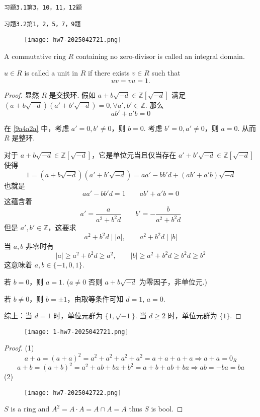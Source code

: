 \begin{lstlisting}
习题3.1第3，10，11，12题

习题3.2第1，2，5，7，9题
\end{lstlisting}
\begin{exercise}
\begin{figure}[H]
\centering
\texttt{[image: hw7-2025042721.png]}
\label{}
\end{figure}
\end{exercise}
\begin{definition}
A commutative ring $R$ containing no zero-divisor is called an integral domain.
\end{definition}
\begin{definition}[unit]
$u \in R$ is called a unit in $R$ if there exists $v \in R$ such that
\[
u v=v u=1 .
\]
\end{definition}
\begin{proof}
显然 $R$ 是交换环. 假如 $a+b \sqrt{ -d }\in \mathbb{Z}[\sqrt{ -d }]$ 满足 $(a+b \sqrt{ -d })(a'+b'\sqrt{ -d })=0, \forall a', b'\in \mathbb{Z}$. 那么
\begin{equation}
ab'+a'b=0
\label{9a4a2a}
\end{equation}

在 \cref{9a4a2a} 中，考虑 $a'=0,b'\neq0$，则 $b=0$. 考虑 $b'=0,a'\neq0$，则 $a=0$. 从而 $R$ 是整环.

对于 $a+b \sqrt{ -d }\in \mathbb{Z}[\sqrt{ -d }]$，它是单位元当且仅当存在 $a'+b'\sqrt{ -d }\in \mathbb{Z}[\sqrt{ -d }]$ 使得
\[
1=(a+b \sqrt{ -d })(a'+b'\sqrt{ -d })=aa'-b b'd+(ab'+a'b)\sqrt{ -d }
\]
也就是
\[
aa'-b b'd=1\qquad ab'+a'b=0
\]
这蕴含着
\[
a'=\frac{a}{a^2+b^2d}\qquad b'=-\frac{b}{a^2+b^2d}
\]
但是 $a', b'\in \mathbb{Z}$，这要求
\[
a^2+b^2d\mid \lvert a \rvert ,\qquad a^2+b^2d\mid \lvert b \rvert 
\]
当 $a,b$ 非零时有
\[
\lvert a \rvert \geq a^2+b^2d\geq a^2,\qquad \lvert b \rvert \geq a^2+b^2d\geq b^2d\geq b^2
\]
这意味着 $a, b\in \{ -1,0,1 \}$.

若 $b=0$，则 $a=1$. ($a\neq0$ 否则 $a+b \sqrt{ -d }$ 为零因子，非单位元.)

若 $b\neq0$，则 $b=\pm1$，由取等条件可知 $d=1$, $a=0$.

综上：当 $d=1$ 时，单位元群为 $\{ 1,\sqrt{ -1 } \}$. 当 $d\geq2$ 时，单位元群为 $\{ 1 \}$.

\end{proof}

\begin{exercise}
\begin{figure}[H]
\centering
\texttt{[image: 1-hw7-2025042721.png]}
\label{}
\end{figure}
\end{exercise}
\begin{proof}
(1)
\[
a+a=(a+a)^2=a^2+a^2+a^2+a^2=a+a+a+a\Rightarrow a+a=0_{R}
\]
\[
a+b=(a+b)^2=a^2+ab+ba+b^2=a+b+ab+ba\Rightarrow ab=-ba=ba
\]
(2)
\begin{figure}[H]
\centering
\texttt{[image: hw7-2025042722.png]}
\label{}
\end{figure}
$S$ is a ring and $A^2=A\cdot A=A\cap A=A$ thus $S$ is bool.
\end{proof}

